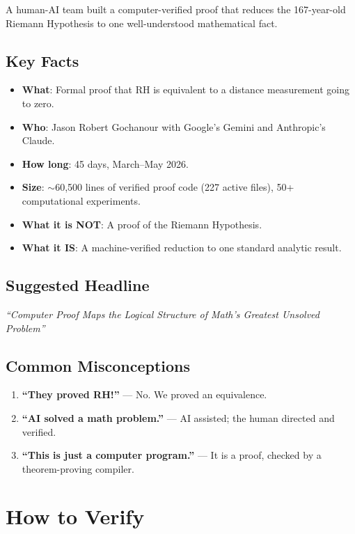 \documentclass[11pt,a4paper]{article}
\begin{document}
A human-AI team built a computer-verified proof that reduces the
167-year-old Riemann Hypothesis to one well-understood mathematical
fact.

\subsection{Key Facts}

\begin{itemize}
  \item \textbf{What}: Formal proof that RH is equivalent to a
    distance measurement going to zero.
  \item \textbf{Who}: Jason Robert Gochanour with Google's Gemini
    and Anthropic's Claude.
  \item \textbf{How long}: 45 days, March--May 2026.
  \item \textbf{Size}: $\sim$60{,}500 lines of verified proof code
    (227 active files), 50+ computational experiments.
  \item \textbf{What it is NOT}: A proof of the Riemann Hypothesis.
  \item \textbf{What it IS}: A machine-verified reduction to one
    standard analytic result.
\end{itemize}

\subsection{Suggested Headline}

\emph{``Computer Proof Maps the Logical Structure of Math's Greatest
Unsolved Problem''}

\subsection{Common Misconceptions}

\begin{enumerate}
  \item \textbf{``They proved RH!''} --- No. We proved an equivalence.
  \item \textbf{``AI solved a math problem.''} --- AI assisted; the
    human directed and verified.
  \item \textbf{``This is just a computer program.''} --- It is a
    proof, checked by a theorem-proving compiler.
\end{enumerate}

\section{How to Verify}
\end{document}
